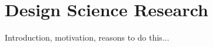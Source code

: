 \chapter{Design Science Research}
\label{cha:design_science_research}

Introduction, motivation, reasons to do this...





